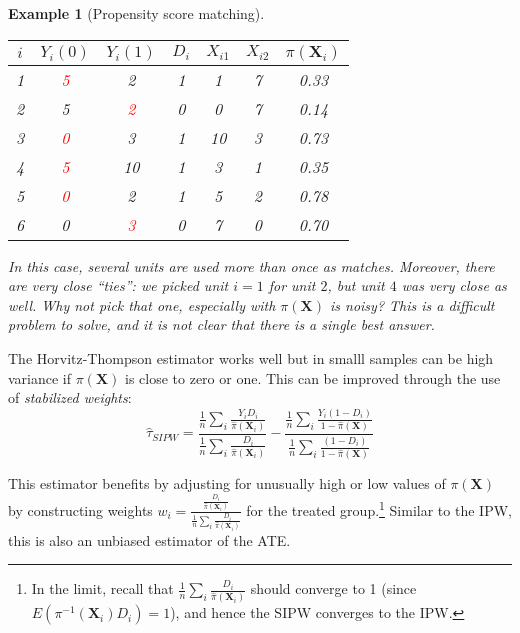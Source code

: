 \documentclass{tufte-handout}
\theoremstyle{break}
\newtheorem{exmp}{Example}
\newcommand{\bX}{\mathbf{X}}
\begin{document}
\begin{boxD}
\begin{exmp}[Propensity score matching]
  \centering
  \begin{tabular}{ccccccc}
    $i$ & $Y_{i}(0)$ & $Y_{i}(1)$ & $D_{i}$ & $X_{i1}$ & $X_{i2}$ & $\pi(\mathbf{X}_{i})$\\
    \midrule
    1 & \textcolor{red}{5} & 2 & 1 & 1 & 7 & 0.33\\
    2 & 5 & \textcolor{red}{2} & 0 & 0 & 7 & 0.14\\    
    3 & \textcolor{red}{0} & 3 & 1 & 10 & 3 & 0.73\\
    4 & \textcolor{red}{5} & 10 & 1 & 3 & 1 & 0.35\\
    5 & \textcolor{red}{0} & 2 & 1 & 5 & 2 & 0.78\\
    6 & 0 & \textcolor{red}{3} & 0 & 7 & 0 & 0.70\\        
  \end{tabular}

  \raggedright
  \hspace{10pt}In this case, several units are used more than once as matches. Moreover, there are very close ``ties'': we picked unit $i=1$ for unit $2$, but unit $4$ was very close as well. Why not pick that one, especially with $\pi(\bX)$ is noisy? This is a difficult problem to solve, and it is not clear that there is a single best answer.
    \end{exmp}
\end{boxD}

The Horvitz-Thompson estimator works well but in smalll samples can be high variance if $\pi(\bX)$ is close to zero or one. This can be improved through the use of \emph{stabilized weights}:
\begin{equation*}
    \hat{\tau}_{SIPW} = \frac{\frac{1}{n}\sum_{i}\frac{Y_{i}D_{i}}{\hat{\pi}(\mathbf{X}_{i})}}{\frac{1}{n}\sum_{i}\frac{D_{i}}{\hat{\pi}(\mathbf{X}_{i})}} - \frac{\frac{1}{n}\sum_{i}\frac{Y_{i}(1-D_{i})}{1-\hat{\pi}(\mathbf{X})}}{\frac{1}{n}\sum_{i}\frac{(1-D_{i})}{1-\hat{\pi}(\mathbf{X})}}
  \end{equation*}

This estimator benefits by adjusting for unusually high or low values of $\pi(\mathbf{X})$ by constructing weights $w_{i} = \frac{\frac{D_{i}}{\hat{\pi}(\mathbf{X}_{i})}}{\frac{1}{n}\sum_{i}\frac{D_{i}}{\hat{\pi}(\mathbf{X}_{i})}} $ for the treated group.\footnote{In the limit, recall that $\frac{1}{n}\sum_{i}\frac{D_{i}}{\hat{\pi}(\mathbf{X}_{i})}$ should converge to 1 (since $E(\pi^{-1}(\bX_{i})D_{i}) = 1$), and hence the SIPW converges to the IPW.} Similar to the IPW, this is also an unbiased estimator of the ATE.
\end{document}
